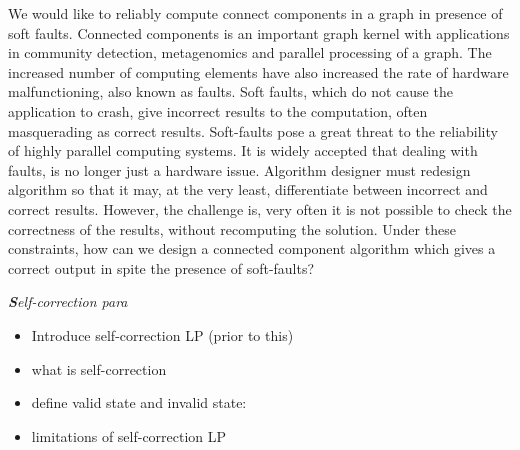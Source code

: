 
We would like to reliably compute connect components in a graph in presence of
soft faults. Connected components is an important graph kernel with
applications in community detection, metagenomics and parallel processing of a
graph.  The increased number of computing elements have also increased the
rate of hardware malfunctioning, also known as faults.  Soft faults, which do
not cause the application to crash,  give incorrect results to the
computation, often masquerading as correct results. Soft-faults pose a great
threat to the reliability of highly parallel computing systems. It is widely
accepted that dealing with faults, is no longer just a hardware issue.
Algorithm designer must redesign algorithm so that it may, at the very least,
differentiate between incorrect and correct results. However, the challenge
is, very often it is not possible to check the correctness of the results,
without recomputing the solution.  Under these constraints, how can we design
a connected component algorithm which gives a correct output in spite the
presence of soft-faults?


\textbf{\emph{}}%
\begin{lyxgreyedout}
\textbf{\emph{S}}\emph{elf-correction para} 
\begin{itemize}
\item Introduce self-correction LP (prior to this) 
\item what is self-correction 
\item define valid state and invalid state: 
\item limitations of self-correction LP 
\end{itemize}
\end{lyxgreyedout}

